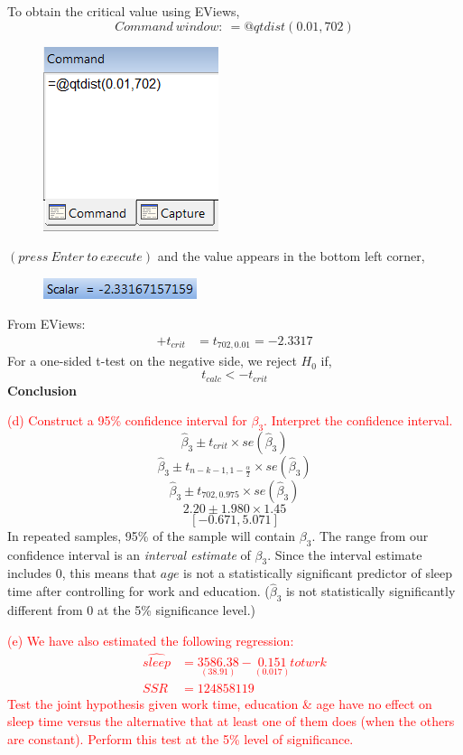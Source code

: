 \documentclass[12pt]{report}
\begin{document}
\noindent To obtain the critical value using EViews,
$$Command\ window:\ =@qtdist(0.01,702)$$
\begin{figure}[H]
	\centering
	\includegraphics{tute6_q2_5}
\end{figure}
\vspace{-\baselineskip}\centering $(press\ Enter\ to\ execute)$
\justify and the value appears in the bottom left corner,
\begin{figure}[H]
	\centering
	\includegraphics{tute6_q2_6}
\end{figure}
\vspace{-\baselineskip}
\noindent From EViews: \begin{align*}
+t_{crit} &= t_{702,0.01} = -2.3317
\end{align*}
\noindent For a one-sided t-test on the negative side, we reject $H_0$ if,
$$t_{calc} < -t_{crit}$$
\noindent \textbf{Conclusion}


\noindent \textcolor{red}{(d) Construct a 95\% confidence interval for $\beta_3$. Interpret the confidence interval.}
$$\hat{\beta}_3 \pm t_{crit} \times se(\hat{\beta}_3)$$
$$\hat{\beta}_3 \pm t_{n-k-1,1-\frac{\alpha}{2}} \times se(\hat{\beta}_3)$$
$$\hat{\beta}_3 \pm t_{702,0.975} \times se(\hat{\beta}_3)$$
$$2.20 \pm 1.980 \times 1.45$$
$$[-0.671,5.071]$$
\noindent In repeated samples, 95\% of the sample will contain $\beta_3$. The range from our confidence interval is an \textit{interval estimate} of $\beta_3$. Since the interval estimate includes $0$, this means that $age$ is not a statistically significant predictor of sleep time after controlling for work and education. ($\hat{\beta}_3$ is not statistically significantly different from 0 at the 5\% significance level.)

\noindent \textcolor{red}{(e) We have also estimated the following regression: \begin{align}
	\widehat{sleep} &= \underset{(38.91)}{3586.38} - \underset{(0.017)}{0.151}totwrk \\
	SSR &= 124858119 \nonumber
	\end{align} Test the joint hypothesis given work time, education \& age have no effect on sleep time versus the alternative that at least one of them does (when the others are constant). Perform this test at the 5\% level of significance.}
\end{document}
